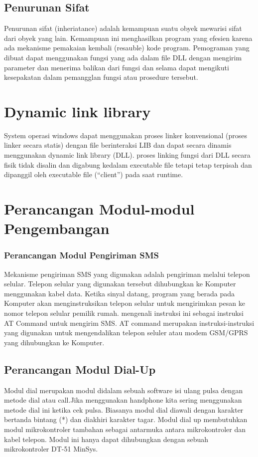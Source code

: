 \documentclass[12pt,a4paper]{article}
\begin{document}
\subsection{Penurunan Sifat}
Penurunan sifat (inheriatance) adalah kemampuan suatu obyek mewarisi sifat dari obyek yang lain. Kemampuan ini menghasilkan program yang efesien karena ada mekanisme pemakaian kembali (resauble) kode program. Pemograman yang dibuat dapat menggunakan fungsi yang ada dalam file DLL dengan mengirim parameter dan menerima balikan dari fungsi dan selama dapat mengikuti kesepakatan dalam pemangglan fungsi atau prosedure tersebut.


\section{Dynamic link library}
System operasi windows dapat menggunakan proses linker konvensional (proses linker secara statis) dengan file berinteraksi LIB dan dapat secara dinamis menggunakan dynamic link library (DLL).
proses linking fungsi dari DLL secara fisik tidak disalin dan digabung kedalam executable file tetapi tetap terpisah dan dipanggil oleh executable file (“client”) pada saat runtime.

\section{Perancangan Modul-modul Pengembangan}
\subsubsection{Perancangan Modul Pengiriman SMS}
Mekanisme pengiriman SMS yang digunakan adalah pengiriman melalui telepon selular. Telepon selular yang digunakan tersebut dihubungkan ke Komputer menggunakan kabel data. Ketika sinyal datang, program yang berada pada Komputer akan menginstruksikan telepon selular untuk mengirimkan pesan ke nomor telepon selular pemilik rumah.
mengenali instruksi ini sebagai instruksi AT Command untuk mengirim SMS. AT command merupakan instruksi-instruksi yang digunakan untuk mengendalikan telepon seluler atau modem GSM/GPRS yang dihubungkan ke Komputer.
\subsection{Perancangan Modul Dial-Up}
Modul dial merupakan modul didalam sebuah software isi ulang pulsa dengan metode dial atau call.Jika menggunakan handphone kita sering menggunakan metode dial ini ketika cek pulsa. Biasanya modul dial diawali dengan karakter bertanda bintang (*) 
dan diakhiri karakter tagar. Modul dial up membutuhkan modul mikrokontroler tambahan 
sebagai antarmuka antara mikrokontroler dan kabel telepon. Modul ini hanya dapat dihubungkan dengan 
sebuah mikrokontroler DT-51 MinSys.
\end{document}
